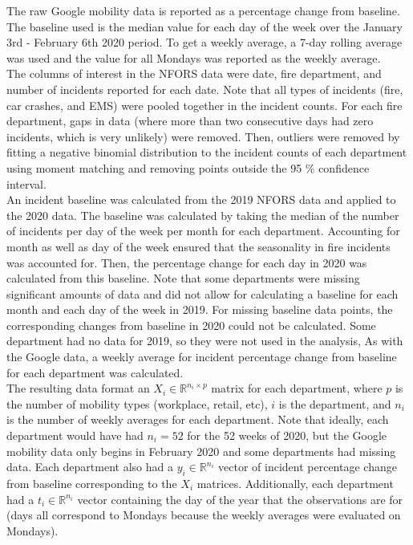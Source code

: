 \documentclass[paper=a4, fontsize=11pt]{scrartcl}
\begin{document}
The raw Google mobility data is reported as a percentage change from baseline. The baseline used is the median value for each day of the week over the January 3rd - February 6th 2020 period. To get a weekly average, a 7-day rolling average was used and the value for all Mondays was reported as the weekly average. \\

The columns of interest in the NFORS data were date, fire department, and number of incidents reported for each date. Note that all types of incidents (fire, car crashes, and EMS) were pooled together in the incident counts. For each fire department, gaps in data (where more than two consecutive days had zero incidents, which is very unlikely) were removed. Then, outliers were removed by fitting a negative binomial distribution to the incident counts of each department using moment matching and removing points outside the 95 \% confidence interval.\\


An incident baseline was calculated from the 2019 NFORS data and applied to the 2020 data. The baseline was calculated by taking the median of the number of incidents per day of the week per month for each department. Accounting for month as well as day of the week ensured that the seasonality in fire incidents was accounted for. Then, the percentage change for each day in 2020 was calculated from this baseline. Note that some departments were missing significant amounts of data and did not allow for calculating a baseline for each month and each day of the week in 2019. For missing baseline data points, the corresponding changes from baseline in 2020 could not be calculated.  Some department had no data for 2019, so they were not used in the analysis, As with the Google data, a weekly average for incident percentage change from baseline for each department was calculated. \\

 The resulting data format  an $X_i \in \mathbb{R}^{n_i \times p}$ matrix for each department, where $p$ is the number of mobility types (workplace, retail, etc), $i$ is the department, and $n_i$ is the number of weekly averages for each department. Note that ideally, each department would have had $n_i = 52$ for the 52 weeks of 2020, but the Google mobility data only begins in February 2020 and some departments had missing data. Each department also had a $y_i \in \mathbb{R}^{n_i}$ vector of incident percentage change from baseline corresponding to the $X_i$ matrices. Additionally, each department had a $t_i \in \mathbb{R}^{n_i}$ vector containing the day of the year that the observations are for (days all correspond to Mondays because the weekly averages were evaluated on Mondays).
\end{document}
